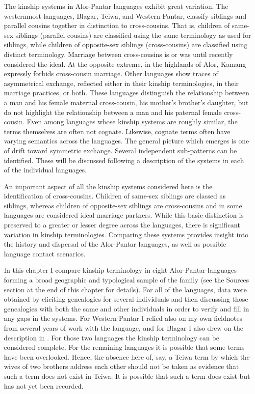 The kinship systems in Alor-Pantar languages exhibit great variation. The westernmost languages, Blagar, Teiwa, and Western Pantar, classify siblings and parallel cousins together in distinction to cross-cousins. That is, children of same-sex siblings (parallel cousins) are classified using the same terminology as used for siblings, while children of opposite-sex siblings (cross-cousins) are classified using distinct terminology. Marriage between cross-cousins is or was until recently considered the ideal. At the opposite extreme, in the highlands of Alor, Kamang expressly forbids cross-cousin marriage. Other languages show traces of asymmetrical exchange, reflected either in their kinship terminologies, in their marriage practices, or both. These languages distinguish the relationship between a man and his female maternal cross-cousin, his mother's brother's daughter, but do not highlight the relationship between a man and his paternal female cross-cousin. Even among languages whose kinship systems are roughly similar, the terms themselves are often not cognate. Likewise, cognate terms often have varying semantics across the languages. The general picture which emerges is one of drift toward symmetric exchange. Several independent sub-patterns can be identified. These will be discussed following a description of the systems in each of the individual languages.

An important aspect of all the kinship systems considered here is the identification of cross-cousins. Children of same-sex siblings are classed as siblings, whereas children of opposite-sex siblings are cross-cousins and in some languages are considered ideal marriage partners. While this basic distinction is preserved to a greater or lesser degree across the languages, there is significant variation in kinship terminologies. Comparing these systems provides insight into the history and dispersal of the Alor-Pantar languages, as well as possible language contact scenarios.

In this chapter I compare kinship terminology in eight Alor-Pantar languages forming a broad geographic and typological sample of the family (see the Sources section at the end of this chapter for details). For all of the languages, data were obtained by eliciting genealogies for several individuals and then discussing those genealogies with both the same and other individuals in order to verify and fill in any gaps in the systems. For Western Pantar I relied also on my own fieldnotes from several years of work with the language, and for Blagar I also drew on the description in \citet{Steinhauer1993}. For those two languages the kinship terminology can be considered complete. For the remaining languages it is possible that some terms have been overlooked. Hence, the absence here of, say, a Teiwa term by which the wives of two brothers address each other should not be taken as evidence that such a term does not exist in Teiwa. It is possible that such a term does exist but has not yet been recorded.

